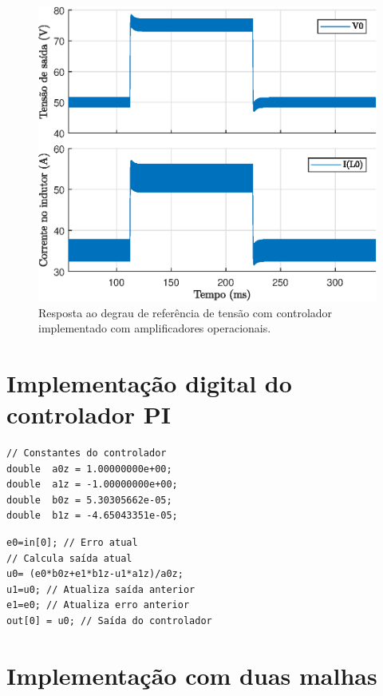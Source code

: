 \begin{figure}[!ht]
	\centering
	\includegraphics[width=0.9\linewidth]{Figs/Buck1malhaAmpOp}
	\caption{Resposta ao degrau de referência de tensão com controlador implementado com amplificadores operacionais.}
	\label{fig:buck1malhaAmpOp}
\end{figure}



\section{Implementação digital do controlador PI}


\begin{lstlisting}[caption={Parâmetros do controlador PI digital de tensão.},label={lst:valoresPI}]
// Constantes do controlador
double  a0z = 1.00000000e+00;
double  a1z = -1.00000000e+00;
double  b0z = 5.30305662e-05;
double  b1z = -4.65043351e-05;
\end{lstlisting}

\begin{lstlisting}[caption={Implementação do controlador PI digital de tensão.},label={lst:implementacaoPI}]
e0=in[0]; // Erro atual
// Calcula saída atual 
u0= (e0*b0z+e1*b1z-u1*a1z)/a0z; 
u1=u0; // Atualiza saída anterior
e1=e0; // Atualiza erro anterior    
out[0] = u0; // Saída do controlador
\end{lstlisting}


\section{Implementação com duas malhas}

